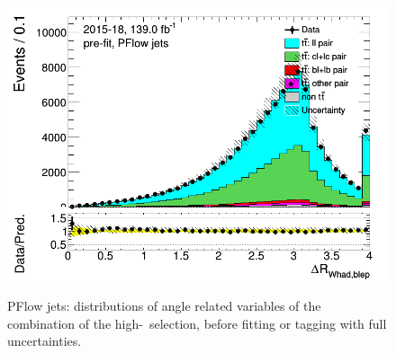 \documentclass[letterpaper,12pt]{article}
\begin{document}
\begin{figure}[H]
\includegraphics[width=.45\textwidth]{FTAG_plots/pretagNoRwnewonlyPFlowall/DataMC_h_dRWhadblep.png} \\
\caption{PFlow jets: distributions of angle related variables of the combination of the high-\pt\ selection,
 before fitting or 
tagging with full uncertainties.} \label{fig:highpT_angles_PFlow}
\end{figure}
\end{document}
